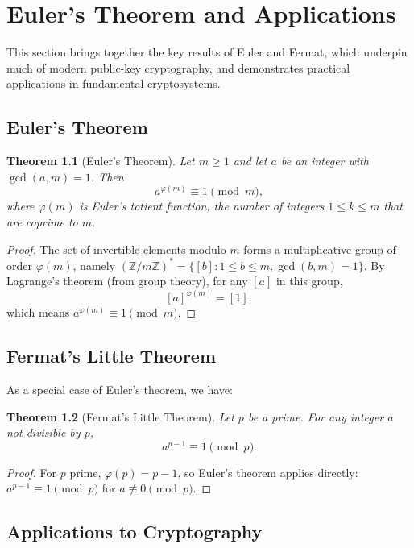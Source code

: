 \documentclass[12pt,openany]{book}
\theoremstyle{definition}
\theoremstyle{plain}
\newtheorem{theorem}{Theorem}[chapter]
\theoremstyle{remark}
\begin{document}
\chapter{Euler’s Theorem and Applications}

This section brings together the key results of Euler and Fermat, which underpin much of modern public-key cryptography, and demonstrates practical applications in fundamental cryptosystems.

\section{Euler’s Theorem}

\begin{theorem}[Euler’s Theorem]
  Let $m \geq 1$ and let $a$ be an integer with $\gcd(a, m) = 1$. Then
  \[
    a^{\varphi(m)} \equiv 1 \pmod{m},
  \]
  where $\varphi(m)$ is Euler’s totient function, the number of integers $1 \leq k \leq m$ that are coprime to $m$.
\end{theorem}

\begin{proof}
  The set of invertible elements modulo $m$ forms a multiplicative group of order $\varphi(m)$, namely $(\mathbb{Z}/m\mathbb{Z})^* = \{ [b] : 1 \leq b \leq m, \gcd(b, m) = 1 \}$. By Lagrange’s theorem (from group theory), for any $[a]$ in this group,
  \[
    [a]^{\varphi(m)} = [1],
  \]
  which means $a^{\varphi(m)} \equiv 1 \pmod{m}$.
\end{proof}

\section{Fermat’s Little Theorem}

As a special case of Euler’s theorem, we have:

\begin{theorem}[Fermat’s Little Theorem]
  Let $p$ be a prime. For any integer $a$ not divisible by $p$,
  \[
    a^{p-1} \equiv 1 \pmod{p}.
  \]
\end{theorem}

\begin{proof}
  For $p$ prime, $\varphi(p) = p-1$, so Euler’s theorem applies directly: $a^{p-1} \equiv 1 \pmod{p}$ for $a \not\equiv 0 \pmod{p}$.
\end{proof}

\newpage

\section{Applications to Cryptography}
\end{document}
